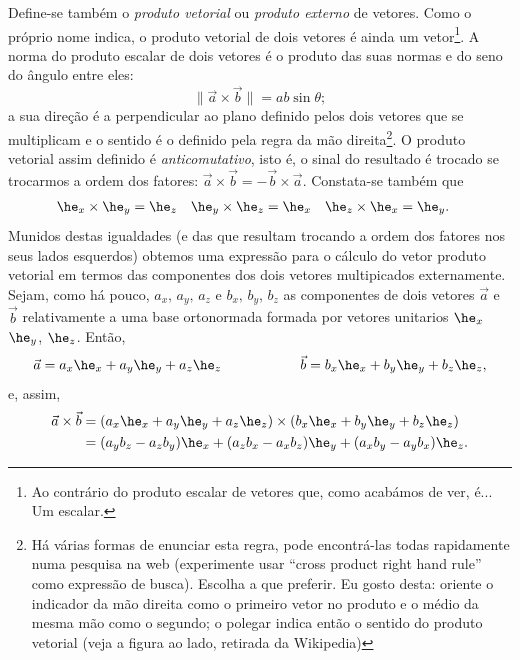 Define-se também o \emph{produto vetorial} ou \emph{produto externo} de vetores.
Como o próprio nome indica, o produto vetorial de dois vetores é ainda um
vetor\footnote{Ao contrário do produto escalar de vetores que, como acabámos de
ver, é... Um escalar.}. A norma do produto escalar de dois vetores é o produto
das suas normas e do seno do ângulo entre eles:
\begin{equation}
  \|\vec a\times\vec b\|=ab\sin\theta;
\end{equation}
a sua direção é a perpendicular ao plano definido pelos dois vetores que se
multiplicam e o sentido é o definido pela regra da mão direita\footnote{%
  \parbox[t]{0.8\textwidth}{Há várias formas de enunciar esta regra, pode
    encontrá-las todas rapidamente numa pesquisa na web (experimente usar
    ``cross product right hand rule'' como expressão de busca). Escolha a que
    preferir. Eu gosto desta: oriente o indicador da mão direita como o primeiro
    vetor no produto e o médio da mesma mão como o segundo; o polegar indica
  então o sentido do produto vetorial (veja a figura ao lado, retirada da
  Wikipedia)}\hfill
  \parbox[t]{1.8cm}{%
  }
}.
O produto vetorial assim definido é \emph{anticomutativo}, isto é, o sinal do
resultado é trocado se trocarmos a ordem dos fatores: $\vec a\times\vec b=-\vec
b\times\vec a$. Constata-se também que
\begin{align}
  \he_x\times\he_y&=\he_z&
  \he_y\times\he_z&=\he_x&
  \he_z\times\he_x&=\he_y.
\end{align}
Munidos destas igualdades (e das que resultam trocando a ordem dos fatores nos
seus lados esquerdos) obtemos uma expressão para o cálculo do vetor produto
vetorial em termos das componentes dos dois vetores multipicados externamente.
Sejam, como há pouco, $a_x,\,a_y,\,a_z$ e $b_x,\,b_y,\,b_z$ as componentes de
dois vetores $\vec a $ e $\vec b$ relativamente a uma base ortonormada formada
por vetores unitarios $\he_x$ $\he_y$, $\he_z$. Então,
\begin{equation*}
  \vec a = a_x\he_x+a_y\he_y+a_z\he_z\rule{2cm}{0mm}
  \vec b = b_x\he_x+b_y\he_y+b_z\he_z,
\end{equation*}
e, assim,
\begin{align*}
  \vec a \times \vec b &=
  (a_x\he_x+a_y\he_y+a_z\he_z)\times
  (b_x\he_x+b_y\he_y+b_z\he_z)\\
  &=
  (a_yb_z-a_zb_y)\he_x+(a_zb_x-a_xb_z)\he_y+(a_xb_y-a_yb_x)\he_z.
\end{align*}
